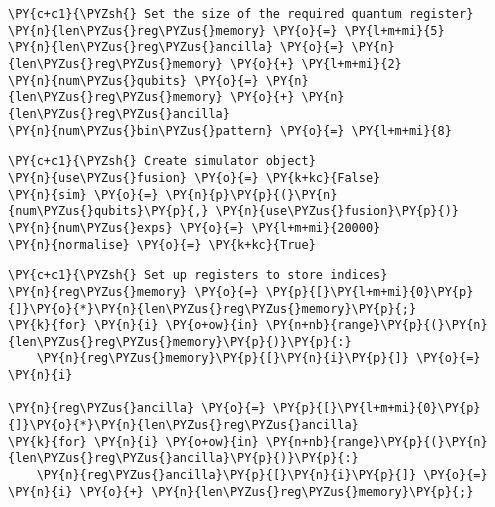     \begin{tcolorbox}[breakable, size=fbox, boxrule=1pt, pad at break*=1mm,colback=cellbackground, colframe=cellborder]
\begin{Verbatim}[commandchars=\\\{\}]
\PY{c+c1}{\PYZsh{} Set the size of the required quantum register}
\PY{n}{len\PYZus{}reg\PYZus{}memory} \PY{o}{=} \PY{l+m+mi}{5}
\PY{n}{len\PYZus{}reg\PYZus{}ancilla} \PY{o}{=} \PY{n}{len\PYZus{}reg\PYZus{}memory} \PY{o}{+} \PY{l+m+mi}{2}
\PY{n}{num\PYZus{}qubits} \PY{o}{=} \PY{n}{len\PYZus{}reg\PYZus{}memory} \PY{o}{+} \PY{n}{len\PYZus{}reg\PYZus{}ancilla}
\PY{n}{num\PYZus{}bin\PYZus{}pattern} \PY{o}{=} \PY{l+m+mi}{8}
\end{Verbatim}
\end{tcolorbox}

    \begin{tcolorbox}[breakable, size=fbox, boxrule=1pt, pad at break*=1mm,colback=cellbackground, colframe=cellborder]
\begin{Verbatim}[commandchars=\\\{\}]
\PY{c+c1}{\PYZsh{} Create simulator object}
\PY{n}{use\PYZus{}fusion} \PY{o}{=} \PY{k+kc}{False}
\PY{n}{sim} \PY{o}{=} \PY{n}{p}\PY{p}{(}\PY{n}{num\PYZus{}qubits}\PY{p}{,} \PY{n}{use\PYZus{}fusion}\PY{p}{)}
\PY{n}{num\PYZus{}exps} \PY{o}{=} \PY{l+m+mi}{20000}
\PY{n}{normalise} \PY{o}{=} \PY{k+kc}{True}
\end{Verbatim}
\end{tcolorbox}

    \begin{tcolorbox}[breakable, size=fbox, boxrule=1pt, pad at break*=1mm,colback=cellbackground, colframe=cellborder]
\begin{Verbatim}[commandchars=\\\{\}]
\PY{c+c1}{\PYZsh{} Set up registers to store indices}
\PY{n}{reg\PYZus{}memory} \PY{o}{=} \PY{p}{[}\PY{l+m+mi}{0}\PY{p}{]}\PY{o}{*}\PY{n}{len\PYZus{}reg\PYZus{}memory}\PY{p}{;}
\PY{k}{for} \PY{n}{i} \PY{o+ow}{in} \PY{n+nb}{range}\PY{p}{(}\PY{n}{len\PYZus{}reg\PYZus{}memory}\PY{p}{)}\PY{p}{:}
    \PY{n}{reg\PYZus{}memory}\PY{p}{[}\PY{n}{i}\PY{p}{]} \PY{o}{=} \PY{n}{i}

\PY{n}{reg\PYZus{}ancilla} \PY{o}{=} \PY{p}{[}\PY{l+m+mi}{0}\PY{p}{]}\PY{o}{*}\PY{n}{len\PYZus{}reg\PYZus{}ancilla}
\PY{k}{for} \PY{n}{i} \PY{o+ow}{in} \PY{n+nb}{range}\PY{p}{(}\PY{n}{len\PYZus{}reg\PYZus{}ancilla}\PY{p}{)}\PY{p}{:}
    \PY{n}{reg\PYZus{}ancilla}\PY{p}{[}\PY{n}{i}\PY{p}{]} \PY{o}{=} \PY{n}{i} \PY{o}{+} \PY{n}{len\PYZus{}reg\PYZus{}memory}\PY{p}{;}
\end{Verbatim}
\end{tcolorbox}


